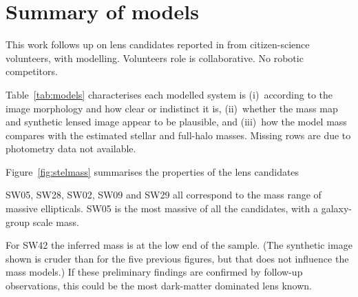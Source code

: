 \section{Summary of models}\label{sec:summary}

This work follows up on lens candidates reported in
\cite{2016MNRAS.455.1191M} from citizen-science volunteers, with
modelling.  Volunteers role is collaborative.  No robotic competitors.

Table~\ref{tab:models} characterises each modelled system is
(i)~according to the image morphology and how clear or indistinct it
is, (ii)~whether the mass map and synthetic lensed image appear to be
plausible, and (iii)~how the model mass compares with the estimated
stellar and full-halo masses.  Missing rows are due to photometry data
not available.

Figure~\ref{fig:stelmass} summarises the properties of the lens
candidates

SW05, SW28, SW02, SW09 and SW29 all correspond to the mass range of
massive ellipticals.  SW05 is the most massive of all the candidates,
with a galaxy-group scale mass.

For SW42 the inferred mass is at the low end of the sample.  (The
synthetic image shown is cruder than for the five previous figures,
but that does not influence the mass models.)  If these preliminary
findings are confirmed by follow-up observations, this could be the
most dark-matter dominated lens known.

